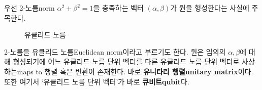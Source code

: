 \documentclass[a4paper,chapter,atbegshi]{oblivoir}
\begin{document}
우선 2-노름{\tiny norm} $\alpha^2+\beta^2=1$을 충족하는 벡터 $(\alpha,\beta)$가
원을 형성한다는 사실에 주목한다. 
\begin{figure}[h]
\begin{center}
  \caption{유클리드 노름\label{fig:1-1}}
\end{center}
\end{figure}
2-노름을 유클리드 노름{\tiny Euclidean norm}이라고 부르기도 한다.
원은 임의의 $\alpha,\beta$에 대해 형성되기에 어느 유클리드 노름 단위
벡터를 다른 유클리드 노름 단위 벡터로 사상하는{\tiny maps to} 행렬 혹은 변환이
존재한다. 바로 \textbf{유니타리 행렬\tiny unitary matrix}이다.
또한 여기서 `유클리드 노름 단위 벡터'가 바로 \textbf{큐비트\tiny qubit}다. 
\end{document}
